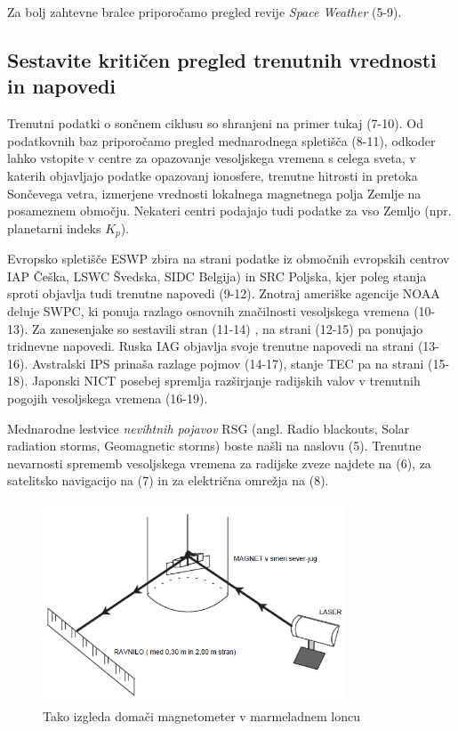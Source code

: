  
Za bolj zahtevne bralce priporočamo pregled revije \textit{Space Weather} (5-9).

\subsection{Sestavite kritičen pregled trenutnih vrednosti in napovedi}
\label{subsec:VesVrem_Podat}
Trenutni podatki o sončnem ciklusu so shranjeni na primer tukaj (7-10). Od podatkovnih baz priporočamo pregled mednarodnega spletišča (8-11), odkoder lahko vstopite v centre za opazovanje vesoljskega vremena s celega sveta, v katerih objavljajo podatke opazovanj ionosfere, trenutne hitrosti in pretoka Sončevega vetra, izmerjene vrednosti lokalnega magnetnega polja Zemlje na posameznem območju. Nekateri centri podajajo tudi podatke za vso Zemljo (npr. planetarni indeks $K_p$).

Evropsko spletišče ESWP zbira na strani podatke iz območnih evropskih centrov IAP Češka, LSWC Švedska, SIDC Belgija) in SRC Poljska, kjer poleg stanja sproti objavlja tudi trenutne napovedi (9-12). Znotraj ameriške agencije NOAA deluje SWPC, ki ponuja razlago osnovnih značilnosti vesoljskega vremena (10-13). Za zanesenjake so sestavili stran (11-14) , na strani (12-15) pa ponujajo tridnevne napovedi. Ruska IAG objavlja svoje trenutne napovedi na strani (13-16). Avstralski IPS prinaša razlage pojmov (14-17), stanje TEC pa na strani (15-18). Japonski NICT posebej spremlja razširjanje radijskih valov v trenutnih pogojih vesoljskega vremena (16-19).

Mednarodne lestvice \textit{nevihtnih pojavov} RSG (angl. Radio blackouts, Solar radiation storms, Geomagnetic storms) boste našli na naslovu (5). 
Trenutne nevarnosti sprememb vesoljskega vremena za radijske zveze najdete na (6), za satelitsko navigacijo na (7) in za električna omrežja na (8).

\begin{figure}
	\centering
	\includegraphics[height=6cm]{Vaje/VesoljVreme/figs/Eksp.png}
	\caption{Tako izgleda domači magnetometer v marmeladnem loncu}
	\label{fig:VesVr_Eksp}       %
\end{figure}
 
